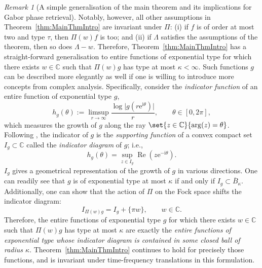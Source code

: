 \documentclass{article}
\renewcommand{\Re}{\operatorname{Re}}
\theoremstyle{remark}
\newtheorem{remark}{Remark}
\begin{document}
\begin{remark}[A simple generalisation of the main theorem and its implications for Gabor phase retrieval]
        Notably, however, all other assumptions in Theorem~\ref{thm:MainThmIntro} are invariant under $\Pi$: (i) if $f$ is of order at most two and type $\tau$, then $\Pi(w)f$ is too; and (ii) if $\Lambda$ satisfies the assumptions of the theorem, then so does $\Lambda - w$. Therefore, Theorem~\ref{thm:MainThmIntro} has a straight-forward generalisation to entire functions of exponential type for which there exists $w \in \mathbb C$ such that $\Pi(w) g$ has type at most $\kappa < \infty$. Such functions $g$ can be described more elegantly as well if one is willing to introduce more concepts from complex analysis. Specifically, consider the \emph{indicator function} of an entire function of exponential type $g$,
        \begin{equation*}
            h_g(\theta) := \limsup_{r \to \infty} \frac{\log \lvert g(r\mathrm e^{\mathrm i \theta}) \rvert}{r}, \qquad \theta \in [0,2\pi],
        \end{equation*}
        which measures the growth of $g$ along the ray $\set{z \in \mathbb C}{ \arg(z) = \theta }$. Following \cite[Section~9.1 on pp.~63--65]{Levin1996Lectures}, the indicator of $g$ is the \emph{supporting function} of a convex compact set $I_g \subset \mathbb C$ called the \emph{indicator diagram} of $g$; i.e., 
        \begin{equation*}
            h_g(\theta) = \sup_{z \in I_g} \Re(z \mathrm e^{-\mathrm i \theta}).
        \end{equation*}
        $I_g$ gives a geometrical representation of the growth of $g$ in various directions. One can readily see that $g$ is of exponential type at most $\kappa$ if and only if $I_g \subset \overline B_\kappa$. Additionally, one can show that the action of $\Pi$ on the Fock space shifts the indicator diagram:
        \begin{equation*}
            I_{\Pi(w) g} = I_g + \lbrace \pi w \rbrace, \qquad w \in \mathbb C. 
        \end{equation*}
        Therefore, the entire functions of exponential type $g$ for which there exists $w \in \mathbb C$ such that $\Pi(w) g$ has type at most $\kappa$ are exactly the \emph{entire functions of exponential type whose indicator diagram is contained in some closed ball of radius $\kappa$}. Theorem~\ref{thm:MainThmIntro} continues to hold for precisely those functions, and is invariant under time-frequency translations in this formulation.


\end{remark}
\end{document}
